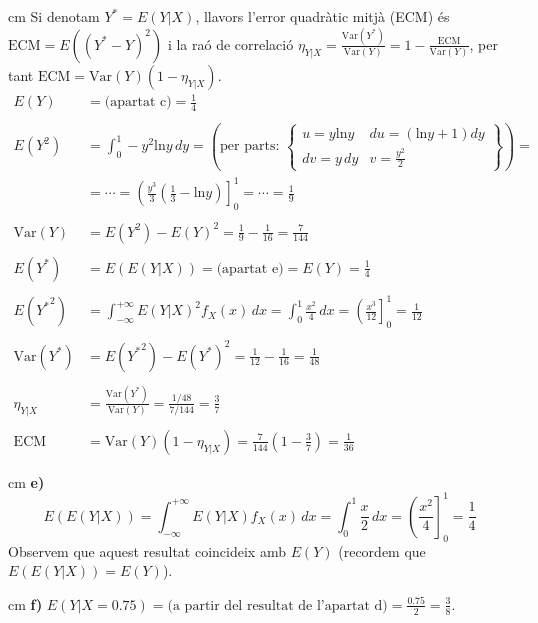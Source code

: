 \documentclass{article}
\begin{document}
 cm
\noindent
Si denotam $Y^*=E(Y|X)$, llavors l'error quadr\`atic mitj\`a (ECM) \'es $\mathrm{ECM}=E((Y^* - Y)^2)$
i la ra\'o de correlaci\'o $\eta_{Y|X} = \frac{\mathrm{Var}(Y^*)}{\mathrm{Var}(Y)}=1-\frac{\mathrm{ECM}}{\mathrm{Var}(Y)}$,
per tant $\mathrm{ECM}=\mathrm{Var}(Y)(1-\eta_{Y|X})$.
\[
\begin{array}{ll}
E(Y) &=  \text{(apartat c)}=\frac{1}{4} \\ \\
E(Y^2) & = \int_0^1 - y^2 \mathrm{ln}y \, dy= \left( \text{per parts: }
\left\{ \begin{array}{ll} u=y \mathrm{ln} y & du= (\mathrm{ln}y+1) dy \\ dv=y\, dy & v=\frac{y^2}{2} \end{array} 
\right\} \right)= \\ 
&= \cdots= \left(  \frac{y^3}{3} (\frac{1}{3}-\mathrm{ln}y) \right]_0^1=\cdots=\frac{1}{9} \\ \\
\mathrm{Var}(Y) &=E(Y^2)-E(Y)^2 = \frac{1}{9} - \frac{1}{16}=\frac{7}{144}\\ \\
E(Y^*) & =E(E(Y|X))=\text{(apartat e)}=E(Y)=\frac{1}{4} \\ \\
E({Y^*}^2) & = \int_{-\infty}^{+\infty} E(Y|X)^2 f_X(x) \, dx = \int_0^1 \frac{x^2}{4} \, dx = 
\left( \frac{x^3}{12} \right]_0^1 = \frac{1}{12} \\ \\
\mathrm{Var}(Y^*) &=E({Y^*}^2)-E(Y^*)^2 = \frac{1}{12} - \frac{1}{16} =\frac{1}{48} \\ \\
\eta_{Y|X} & = \frac{\mathrm{Var}(Y^*)}{\mathrm{Var}(Y)}= \frac{1/48}{7/144}=\frac{3}{7} \\ \\
\mathrm{ECM}& =\mathrm{Var}(Y)(1-\eta_{Y|X}) = \frac{7}{144} (1-\frac{3}{7})=\frac{1}{36}
\end{array}
\]

 cm
\noindent
\textbf{e)} 
\[
E(E(Y|X))=\int_{-\infty}^{+\infty} E(Y|X) f_X(x) \, dx = \int_0^1 \frac{x}{2} \, dx = \left( \frac{x^2}{4} \right]_0^1=
\frac{1}{4}
\]
\noindent
Observem que aquest resultat coincideix amb $E(Y)$ (recordem que $E(E(Y|X))=E(Y)$).

 cm
\noindent
\textbf{f)} $E(Y|X=0.75)=\text{(a partir del resultat de l'apartat d)}=\frac{0.75}{2}= \frac{3}{8}$.
\end{document}
